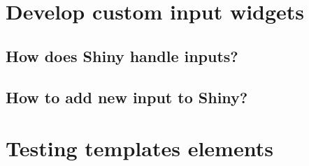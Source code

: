 \documentclass[]{book}
\begin{document}
\hypertarget{custom-templates-inputs}{%
\chapter{Develop custom input widgets}\label{custom-templates-inputs}}

\hypertarget{how-does-shiny-handle-inputs}{%
\section{How does Shiny handle inputs?}\label{how-does-shiny-handle-inputs}}

\hypertarget{how-to-add-new-input-to-shiny}{%
\section{How to add new input to Shiny?}\label{how-to-add-new-input-to-shiny}}

\hypertarget{custom-templates-testing}{%
\chapter{Testing templates elements}\label{custom-templates-testing}}


\end{document}
